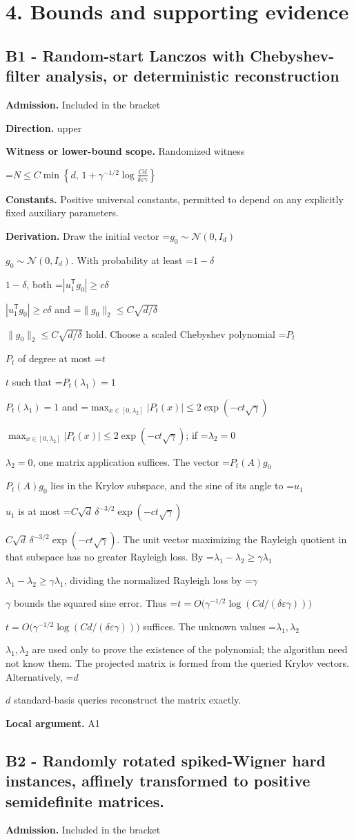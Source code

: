 \documentclass[10pt,a4paper]{article}
\newcommand{\AtlasMath}[1]{\par\begingroup\centering\setbox0=\hbox{$\displaystyle #1$}\ifdim\wd0>1.4\linewidth\typeout{ATLAS WIDE FORMULA: \the\wd0}\fi\ifdim\wd0>\linewidth\resizebox{\linewidth}{!}{\box0}\else\box0\fi\par\endgroup}
\newcommand{\AtlasInlineMath}[1]{\begingroup\setbox0=\hbox{$#1$}\ifdim\wd0>.4\linewidth\endgroup\AtlasMath{#1}\else\endgroup$#1$\fi}
\begin{document}
\section{4. Bounds and supporting evidence}
\subsection{B1 - Random-start Lanczos with Chebyshev-filter analysis, or deterministic reconstruction}
\textbf{Admission.} Included in the bracket

\textbf{Direction.} upper

\textbf{Witness or lower-bound scope.} Randomized witness

\AtlasMath{N\le C\min\left\{d,\,1+\gamma^{-1/2}\log\frac{Cd}{\delta\varepsilon\gamma}\right\}}
\textbf{Constants.} Positive universal constants, permitted to depend on any explicitly fixed auxiliary parameters.

\textbf{Derivation.} Draw the initial vector \AtlasInlineMath{g_0\sim\mathcal N(0,I_d)}. With probability at least \AtlasInlineMath{1-\delta}, both \AtlasInlineMath{|u_1^{\mathsf T}g_0|\ge c\delta} and \AtlasInlineMath{\|g_0\|_2\le C\sqrt{d/\delta}} hold. Choose a scaled Chebyshev polynomial \AtlasInlineMath{P_t} of degree at most \AtlasInlineMath{t} such that \AtlasInlineMath{P_t(\lambda_1)=1} and \AtlasInlineMath{\max_{x\in[0,\lambda_2]}|P_t(x)|\le2\exp(-ct\sqrt\gamma)}; if \AtlasInlineMath{\lambda_2=0}, one matrix application suffices. The vector \AtlasInlineMath{P_t(A)g_0} lies in the Krylov subspace, and the sine of its angle to \AtlasInlineMath{u_1} is at most \AtlasInlineMath{C\sqrt d\,\delta^{-3/2}\exp(-ct\sqrt\gamma)}. The unit vector maximizing the Rayleigh quotient in that subspace has no greater Rayleigh loss. By \AtlasInlineMath{\lambda_1-\lambda_2\ge\gamma\lambda_1}, dividing the normalized Rayleigh loss by \AtlasInlineMath{\gamma} bounds the squared sine error. Thus \AtlasInlineMath{t=O\!\bigl(\gamma^{-1/2}\log(Cd/(\delta\varepsilon\gamma))\bigr)} suffices. The unknown values \AtlasInlineMath{\lambda_1,\lambda_2} are used only to prove the existence of the polynomial; the algorithm need not know them. The projected matrix is formed from the queried Krylov vectors. Alternatively, \AtlasInlineMath{d} standard-basis queries reconstruct the matrix exactly.

\textbf{Local argument.} A1

\subsection{B2 - Randomly rotated spiked-Wigner hard instances, affinely transformed to positive semidefinite matrices.}
\textbf{Admission.} Included in the bracket
\end{document}
